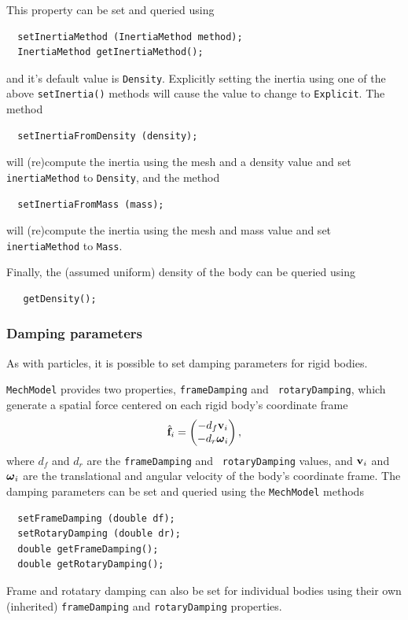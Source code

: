 This property can be set and queried using
%
\begin{lstlisting}
  setInertiaMethod (InertiaMethod method);
  InertiaMethod getInertiaMethod();
\end{lstlisting}
%
and it's default value is {\tt Density}. Explicitly setting the
inertia using one of the above {\tt setInertia()} methods will cause
the value to change to {\tt Explicit}. The method
%
\begin{lstlisting}
  setInertiaFromDensity (density); 
\end{lstlisting}
%
will (re)compute the inertia using the mesh and a density value
and set {\tt inertiaMethod} to {\tt Density}, and
the method
%
\begin{lstlisting}
  setInertiaFromMass (mass); 
\end{lstlisting}
%
will (re)compute the inertia using the mesh and mass value
and set {\tt inertiaMethod} to {\tt Mass}.

Finally, the (assumed uniform) density of the body can be queried
using
%
\begin{lstlisting}
   getDensity();
\end{lstlisting}
%

\subsubsection{Damping parameters}
\label{RigidBodyDamping:sec}

As with particles, it is possible to set damping parameters for rigid
bodies. 

{\tt MechModel} provides two properties, {\tt frameDamping} and {\tt
rotaryDamping}, which generate a spatial force centered on each rigid
body's coordinate frame
%
\begin{equation}
\hat{{\bf f}}_i = \left(\begin{matrix} -d_f {\bf v}_i \\ -d_r \boldsymbol\omega_i \end{matrix}\right),
\end{equation}
%
where $d_f$ and $d_r$ are the {\tt frameDamping} and {\tt
rotaryDamping} values, and ${\bf v}_i$ and $\boldsymbol\omega_i$ are the translational
and angular velocity of the body's coordinate frame.
The damping parameters can be set and queried using the {\tt MechModel}
methods
%
\begin{lstlisting}
  setFrameDamping (double df);
  setRotaryDamping (double dr);
  double getFrameDamping();
  double getRotaryDamping();
\end{lstlisting}
%

Frame and rotatary damping can also be set for individual bodies using
their own (inherited) {\tt frameDamping} and {\tt rotaryDamping}
properties.

